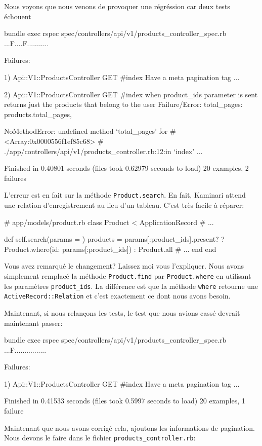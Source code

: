 \documentclass[]{report}
\begin{document}
      \begin{listing}
        \caption{Nous voyons que nous venons de provoquer une régréssion car deux tests échouent}
        \label{lst:meta_spec_regression}
        \begin{bashcode}
        bundle exec rspec spec/controllers/api/v1/products_controller_spec.rb
        ...F....F...........

        Failures:

          1) Api::V1::ProductsController GET #index Have a meta pagination tag
             ...

          2) Api::V1::ProductsController GET #index when product_ids parameter is sent returns just the products that belong to the user
             Failure/Error: total_pages: products.total_pages,

             NoMethodError:
               undefined method `total_pages' for #<Array:0x0000556f1ef85c68>
             # ./app/controllers/api/v1/products_controller.rb:12:in `index'
             ...

        Finished in 0.40801 seconds (files took 0.62979 seconds to load)
        20 examples, 2 failures
        \end{bashcode}
      \end{listing}

      L'erreur est en fait sur la méthode \verb|Product.search|. En fait, Kaminari attend une relation d'enregistrement au lieu d'un tableau. C'est très facile à réparer:

      \begin{rubycode}
      # app/models/product.rb
      class Product < ApplicationRecord
        # ...

        def self.search(params = {})
          products = params[:product_ids].present? ? Product.where(id: params[:product_ids]) : Product.all
          # ...
        end
      end
      \end{rubycode}

      Vous avez remarqué le changement? Laissez moi vous l'expliquer. Nous avons simplement remplacé la méthode \verb|Product.find| par \verb|Product.where| en utilisant les paramètres \verb|product_ids|. La différence est que la méthode \verb|where| retourne une  \verb|ActiveRecord::Relation| et c'est exactement ce dont nous avons besoin.

      Maintenant, si nous relançons les tests, le test que nous avions cassé devrait maintenant passer:

      \begin{bashcode}
      bundle exec rspec spec/controllers/api/v1/products_controller_spec.rb
      ...F................

      Failures:

        1) Api::V1::ProductsController GET #index Have a meta pagination tag
           ...

      Finished in 0.41533 seconds (files took 0.5997 seconds to load)
      20 examples, 1 failure
      \end{bashcode}

      Maintenant que nous avons corrigé cela, ajoutons les informations de pagination. Nous devons le faire dans le fichier \verb|products_controller.rb|:

\end{document}
